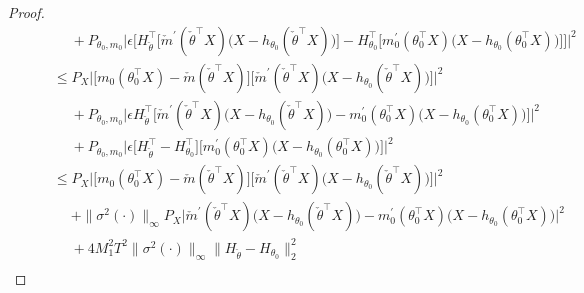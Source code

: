 {\begin{proof}
\begin{align}
&\quad\;  + P_{\theta_0, m_0} \bigg| \epsilon \Big[ H_{\check{\theta}}^\top \big[\check{m}^\prime(\check{\theta} ^\top X) \big(X -  h_{\theta_0}(\check{\theta} ^\top X)\big)\big] -H_{\theta_0}^\top \big[m_0^\prime(\theta_0^\top X) \big(X - h_{\theta_0} (\theta_0^\top X)\big)\big]\Big] \bigg|^2\\
% 
\qquad&\le P_X \Big| \big[ m_0(\theta_0 ^\top X)-\check{m}(\check{\theta}^\top X)\big] \big[\check{m}^\prime(\check{\theta} ^\top X) \big(X -  h_{\theta_0}(\check{\theta} ^\top X)\big)\big]\Big|^2 \\
&\quad\; + P_{\theta_0, m_0} \bigg| \epsilon  H_{\check{\theta}}^\top  \Big[\check{m}^\prime(\check{\theta} ^\top X) \big(X -  h_{\theta_0}(\check{\theta} ^\top X)\big) -m_0^\prime(\theta_0^\top X) \big(X - h_{\theta_0} (\theta_0^\top X)\big)\Big] \bigg|^2\\
&\quad\;+ P_{\theta_0, m_0} \bigg| \epsilon \Big[ H_{\check{\theta}}^\top  -H_{\theta_0}^\top\Big] \big[m_0^\prime(\theta_0^\top X) \big(X - h_{\theta_0} (\theta_0^\top X)\big)\big] \bigg|^2\\
\qquad&\le P_X \Big| \big[ m_0(\theta_0 ^\top X)-\check{m}(\check{\theta}^\top X)\big] \big[\check{m}^\prime(\check{\theta} ^\top X) \big(X -  h_{\theta_0}(\check{\theta} ^\top X)\big)\big]\Big|^2 \\
&\quad\; +  \|\sigma^2(\cdot)\|_\infty P_X \Big|  \check{m}^\prime(\check{\theta} ^\top X) \big(X -  h_{\theta_0}(\check{\theta} ^\top X)\big) -m_0^\prime(\theta_0^\top X) \big(X - h_{\theta_0} (\theta_0^\top X)\big) \Big|^2\\
&\quad\;+ 4 M_1^2 T^2 \|\sigma^2(\cdot)\|_\infty \|H_{\check\theta}-H_{\theta_0}\|_2^2 \\
% 

\end{align}
\end{proof}}
